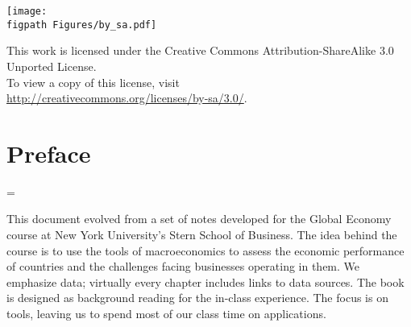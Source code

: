 \begin{titlepage}
\begin{minipage}{0.9in}
\begin{flushleft}
\vspace{0.12in}
\texttt{[image: \\figpath Figures/by\_sa.pdf]} \\
\vfill
\vspace{0.27in}
\phantom{m}
\end{flushleft}
\end{minipage}
\hspace{0.1in}
%
\begin{minipage}{0.80\textwidth}
\begin{flushleft}
 This work is licensed under the Creative Commons Attribution-ShareAlike 3.0 Unported License.\\
 \vspace{0.05in}
 To view a copy of this license, visit \\ \url{http://creativecommons.org/licenses/by-sa/3.0/}.\\
 \end{flushleft}
\end{minipage}
\end{titlepage}


\tableofcontents

\chapter*{Preface}
\parskip = \bigskipamount

This document evolved from a set of notes developed
for the Global Economy course at New York
University's Stern School of Business.
The idea behind the course is to use the tools of macroeconomics
to assess the economic performance of countries
and the challenges facing businesses operating in them.
We emphasize data;
virtually every chapter includes links to data sources.
The book is designed as background reading for the in-class experience.
The focus is on tools,
leaving us to spend most of our class time on applications.

